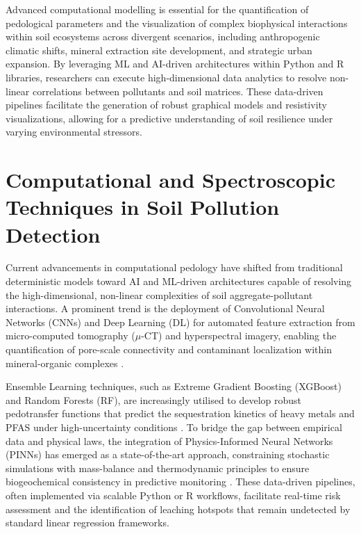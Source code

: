 \documentclass[preprint,12pt]{elsarticle}            %
\begin{document}
Advanced computational modelling is essential for the quantification of
pedological parameters and the visualization of complex biophysical
interactions within soil ecosystems across divergent scenarios, including
anthropogenic climatic shifts, mineral extraction site development, and
strategic urban expansion. By leveraging ML and AI-driven architectures within
Python and R libraries, researchers can execute high-dimensional data analytics
to resolve non-linear correlations between pollutants and soil matrices. These
data-driven pipelines facilitate the generation of robust graphical models and
resistivity visualizations, allowing for a predictive understanding of soil
resilience under varying environmental stressors.

\section{Computational and Spectroscopic Techniques in Soil Pollution
    Detection}\label{sec3}

Current advancements in computational pedology have shifted from traditional
deterministic models toward AI and ML-driven architectures capable of
resolving the high-dimensional, non-linear complexities of soil
aggregate-pollutant interactions. A prominent trend is the deployment of
Convolutional Neural Networks (CNNs) and Deep Learning (DL) for automated
feature extraction from micro-computed tomography ($\mu$-CT) and hyperspectral
imagery, enabling the quantification of pore-scale connectivity and
contaminant localization within mineral-organic complexes
\cite{Demiral2026,Fan2025}.

Ensemble Learning techniques, such as Extreme Gradient Boosting (XGBoost) and
Random Forests (RF), are increasingly utilised to develop robust pedotransfer
functions that predict the sequestration kinetics of heavy metals and PFAS
under high-uncertainty conditions \cite{Sahab2025,Wadoux2024}. To bridge the
gap between empirical data and physical laws, the integration of
Physics-Informed Neural Networks (PINNs) has emerged as a state-of-the-art
approach, constraining stochastic simulations with mass-balance and
thermodynamic principles to ensure biogeochemical consistency in predictive
monitoring \cite{Karpatne2024,Nguyen2025}. These data-driven pipelines, often
implemented via scalable Python or R workflows, facilitate real-time risk
assessment and the identification of leaching hotspots that remain undetected
by standard linear regression frameworks.
\end{document}
